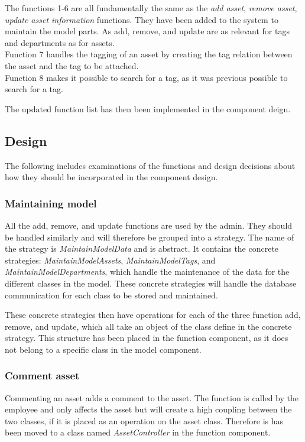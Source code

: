 The functions 1-6 are all fundamentally the same as the \textit{add asset}, \textit{remove asset}, \textit{update asset information} functions. They have been added to the system to maintain the model parts. As add, remove, and update are as relevant for tags and departments as for assets.\\
Function 7 handles the tagging of an asset by creating the tag relation between the asset and the tag to be attached.\\
Function 8 makes it possible to search for a tag, as it was previous possible to search for a tag.
\par
The updated function list has then been implemented in the component deign.

\subsection{Design}
The following includes examinations of the functions and design decisions about how they should be incorporated in the component design.

\subsubsection{Maintaining model}
All the add, remove, and update functions are used by the admin. They should be handled similarly and will therefore be grouped into a strategy. The name of the strategy is \textit{MaintainModelData} and is abstract. It contains the concrete strategies: \textit{MaintainModelAssets}, \textit{MaintainModelTags}, and \textit{MaintainModelDepartments}, which handle the maintenance of the data for the different classes in the model. These concrete strategies will handle the database communication for each class to be stored and maintained.
\par
These concrete strategies then have operations for each of the three function add, remove, and update, which all take an object of the class define in the concrete strategy. This structure has been placed in the function component, as it does not belong to a specific class in the model component.

\subsubsection{Comment asset}
Commenting an asset adds a comment to the asset. The function is called by the employee and only affects the asset but will create a high coupling between the two classes, if it is placed as an operation on the asset class. Therefore is has been moved to a class named \textit{AssetController} in the function component.

